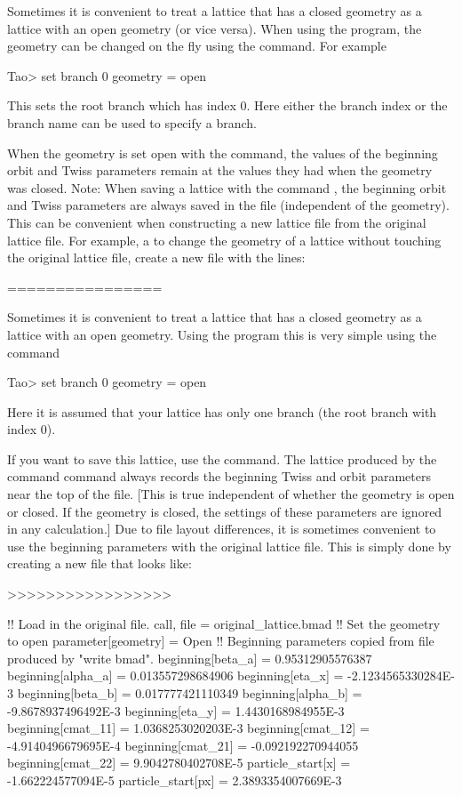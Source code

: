 \documentclass{hitec}     %
\begin{document}
Sometimes it is convenient to treat a lattice that has a closed geometry as a lattice with an open
geometry (or vice versa). When using the \tao program, the geometry can be changed on the fly using
the  command. For example
\begin{code}
Tao> set branch 0 geometry = open
\end{code}
This sets the root branch which has index 0. Here either the branch index or the branch name can
be used to specify a branch.

When the geometry is set open with the \tao {} command, the values of the beginning
orbit and Twiss parameters remain at the values they had when the geometry was closed. Note: When
saving a lattice with the \tao command , the beginning orbit and Twiss parameters are
always saved in the file (independent of the geometry). This can be convenient when constructing a
new lattice file from the original lattice file. For example, a to change the geometry of a lattice
without touching the original lattice file, create a new file with the lines:

================

Sometimes it is convenient to treat a lattice that has a closed geometry as a lattice with an open
geometry. Using the \tao program this is very simple using the  command
\begin{code}
Tao> set branch 0 geometry = open
\end{code}
Here it is assumed that your lattice has only one branch (the root branch with index 0). 

If you want to save this lattice, use the  command. The lattice produced by the
 command command always records the beginning Twiss and orbit parameters near the top
of the file. [This is true independent of whether the geometry is open or closed. If the geometry is
closed, the settings of these parameters are ignored in any calculation.] Due to file layout
differences, it is sometimes convenient to use the beginning parameters with the original
lattice file. This is simply done by creating a new file that looks like:

>>>>>>>>>>>>>>>>>

\begin{code}
!! Load in the original file.
call, file = original_lattice.bmad
!! Set the geometry to open
parameter[geometry] = Open
!! Beginning parameters copied from file produced by "write bmad".
beginning[beta_a]   = 0.95312905576387
beginning[alpha_a]  = 0.013557298684906
beginning[eta_x]    = -2.1234565330284E-3
beginning[beta_b]   = 0.017777421110349
beginning[alpha_b]  = -9.8678937496492E-3
beginning[eta_y]    = 1.4430168984955E-3
beginning[cmat_11]  = 1.0368253020203E-3
beginning[cmat_12]  = -4.9140496679695E-4
beginning[cmat_21]  = -0.092192270944055
beginning[cmat_22]  = 9.9042780402708E-5
particle_start[x]  = -1.662224577094E-5
particle_start[px] = 2.3893354007669E-3
\end{code}
\end{document}
